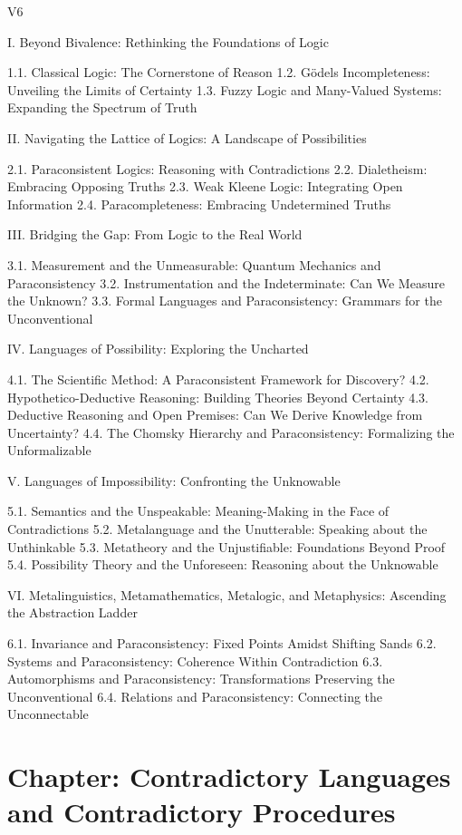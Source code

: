 V6

I. Beyond Bivalence: Rethinking the Foundations of Logic

1.1. Classical Logic: The Cornerstone of Reason 1.2.
Gödel\textquotesingle s Incompleteness: Unveiling the Limits of
Certainty 1.3. Fuzzy Logic and Many-Valued Systems: Expanding the
Spectrum of Truth

II. Navigating the Lattice of Logics: A Landscape of Possibilities

2.1. Paraconsistent Logics: Reasoning with Contradictions 2.2.
Dialetheism: Embracing Opposing Truths 2.3. Weak Kleene Logic:
Integrating Open Information 2.4. Paracompleteness: Embracing
Undetermined Truths

III. Bridging the Gap: From Logic to the Real World

3.1. Measurement and the Unmeasurable: Quantum Mechanics and
Paraconsistency 3.2. Instrumentation and the Indeterminate: Can We
Measure the Unknown? 3.3. Formal Languages and Paraconsistency: Grammars
for the Unconventional

IV. Languages of Possibility: Exploring the Uncharted

4.1. The Scientific Method: A Paraconsistent Framework for Discovery?
4.2. Hypothetico-Deductive Reasoning: Building Theories Beyond Certainty
4.3. Deductive Reasoning and Open Premises: Can We Derive Knowledge from
Uncertainty? 4.4. The Chomsky Hierarchy and Paraconsistency: Formalizing
the Unformalizable

V. Languages of Impossibility: Confronting the Unknowable

5.1. Semantics and the Unspeakable: Meaning-Making in the Face of
Contradictions 5.2. Metalanguage and the Unutterable: Speaking about the
Unthinkable 5.3. Metatheory and the Unjustifiable: Foundations Beyond
Proof 5.4. Possibility Theory and the Unforeseen: Reasoning about the
Unknowable

VI. Metalinguistics, Metamathematics, Metalogic, and Metaphysics:
Ascending the Abstraction Ladder

6.1. Invariance and Paraconsistency: Fixed Points Amidst Shifting Sands
6.2. Systems and Paraconsistency: Coherence Within Contradiction 6.3.
Automorphisms and Paraconsistency: Transformations Preserving the
Unconventional 6.4. Relations and Paraconsistency: Connecting the
Unconnectable

\hypertarget{chapter-contradictory-languages-and-contradictory-procedures}{%
\section*{Chapter: Contradictory Languages and Contradictory
Procedures}\label{chapter-contradictory-languages-and-contradictory-procedures}}


